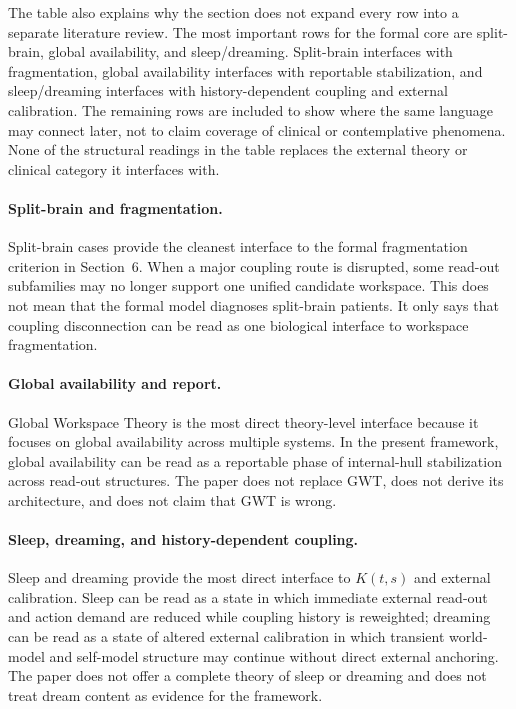 \documentclass[12pt]{article}
\theoremstyle{definition}
\theoremstyle{remark}
\begin{document}
The table also explains why the section does not expand every row into a
separate literature review. The most important rows for the formal core
are split-brain, global availability, and sleep/dreaming. Split-brain
interfaces with fragmentation, global availability interfaces with
reportable stabilization, and sleep/dreaming interfaces with
history-dependent coupling and external calibration. The remaining rows
are included to show where the same language may connect later, not to
claim coverage of clinical or contemplative phenomena.
None of the structural readings in the table replaces the external
theory or clinical category it interfaces with.

\paragraph{Split-brain and fragmentation.}
Split-brain cases provide the cleanest interface to the formal
fragmentation criterion in Section~6. When a major coupling route is
disrupted, some read-out subfamilies may no longer support one unified
candidate workspace. This does not mean that the formal model diagnoses
split-brain patients. It only says that coupling disconnection can be
read as one biological interface to workspace fragmentation.

\paragraph{Global availability and report.}
Global Workspace Theory is the most direct theory-level interface
because it focuses on global availability across multiple systems. In
the present framework, global availability can be read as a reportable
phase of internal-hull stabilization across read-out structures. The
paper does not replace GWT, does not derive its architecture, and does
not claim that GWT is wrong.

\paragraph{Sleep, dreaming, and history-dependent coupling.}
Sleep and dreaming provide the most direct interface to \(K(t,s)\) and
external calibration. Sleep can be read as a state in which immediate
external read-out and action demand are reduced while coupling history
is reweighted; dreaming can be read as a state of altered external
calibration in which transient world-model and self-model structure may
continue without direct external anchoring. The paper does not offer a
complete theory of sleep or dreaming and does not treat dream content as
evidence for the framework.
\end{document}
